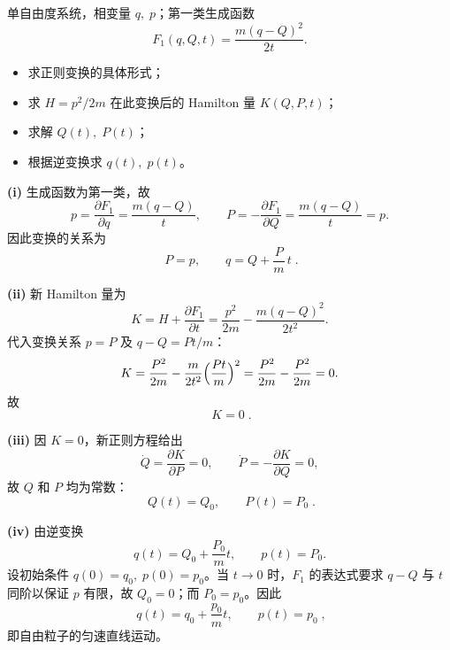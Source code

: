 


\begin{question}
单自由度系统，相变量 \(q,\;p\)；第一类生成函数
\[
F_1(q,Q,t)=\frac{m(q-Q)^2}{2t}.
\]
\begin{itemize}
  \item[\textup{(i)}] 求正则变换的具体形式；
  \item[\textup{(ii)}] 求 \(H=p^2/2m\) 在此变换后的 Hamilton 量 \(K(Q,P,t)\)；
  \item[\textup{(iii)}] 求解 \(Q(t),\;P(t)\)；
  \item[\textup{(iv)}] 根据逆变换求 \(q(t),\;p(t)\)。
\end{itemize}
\begin{solution}
\noindent\textbf{(i)} 生成函数为第一类，故
\[
p=\frac{\partial F_1}{\partial q}= \frac{m(q-Q)}{t},\qquad
P=-\frac{\partial F_1}{\partial Q}= \frac{m(q-Q)}{t}=p .
\]
因此变换的关系为
\[
\boxed{\;P=p,\qquad q=Q+\frac{P}{m}\,t\;}.
\]

\noindent\textbf{(ii)} 新 Hamilton 量为
\[
K=H+\frac{\partial F_1}{\partial t}
=\frac{p^2}{2m}-\frac{m(q-Q)^2}{2t^2}.
\]
代入变换关系 \(p=P\) 及 \(q-Q=Pt/m\)：
\[
K=\frac{P^2}{2m}-\frac{m}{2t^2}\Bigl(\frac{Pt}{m}\Bigr)^2
=\frac{P^2}{2m}-\frac{P^2}{2m}=0 .
\]
故
\[
\boxed{\;K=0\;}.
\]

\noindent\textbf{(iii)} 因 \(K=0\)，新正则方程给出
\[
\dot Q=\frac{\partial K}{\partial P}=0,\qquad
\dot P=-\frac{\partial K}{\partial Q}=0,
\]
故 \(Q\) 和 \(P\) 均为常数：
\[
\boxed{\;Q(t)=Q_0,\qquad P(t)=P_0\;}.
\]

\noindent\textbf{(iv)} 由逆变换
\[
q(t)=Q_0+\frac{P_0}{m}t,\qquad p(t)=P_0 .
\]
设初始条件 \(q(0)=q_0,\;p(0)=p_0\)。当 \(t\to0\) 时，\(F_1\) 的表达式要求 \(q-Q\) 与 \(t\) 同阶以保证 \(p\) 有限，故 \(Q_0=0\)；而 \(P_0=p_0\)。因此
\[
\boxed{\;q(t)=q_0+\frac{p_0}{m}t,\qquad p(t)=p_0\;},
\]
即自由粒子的匀速直线运动。
\end{solution}
\end{question}


